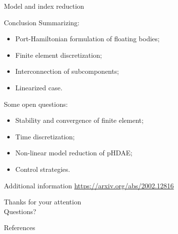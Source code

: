 \documentclass[aspectratio=169]{ISAE-Beamer}
\begin{document}
\begin{frame}{Model and index reduction}

\end{frame}

\begin{frame}{Conclusion}
Summarizing:
	\begin{itemize}
		\item Port-Hamiltonian formulation of floating bodies;
		\item Finite element discretization;
		\item Interconnection of subcomponents;
		\item Linearized case.
	\end{itemize}
Some open questions:
\begin{itemize}
	\item Stability and convergence of finite element;
	\item Time discretization;
	\item Non-linear model reduction of pHDAE;
	\item Control strategies.
\end{itemize}
\centering
\Large Additional information \url{https://arxiv.org/abs/2002.12816} \\
\end{frame}


\begin{frame}{}
\centering

\Huge Thanks for your attention \\
\Huge Questions?
\end{frame}

\begin{frame}{References}
\printbibliography
\end{frame}
\end{document}
